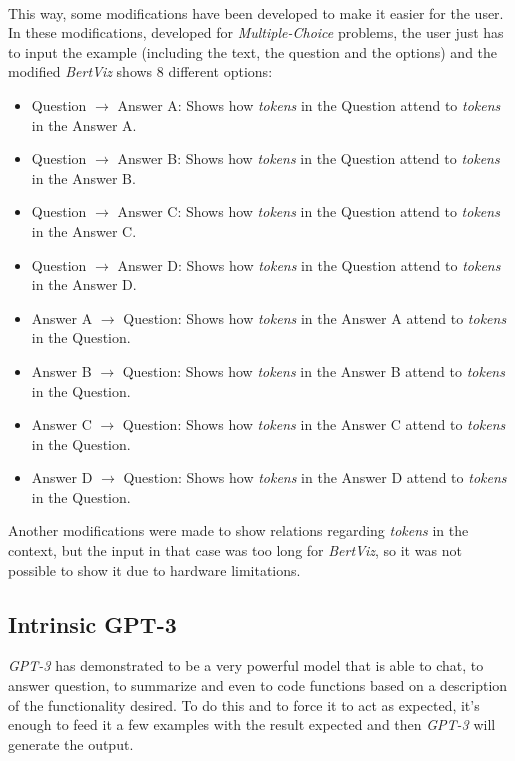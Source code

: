 \paragraph{}
This way, some modifications have been developed to make it easier for the user. In these modifications, developed for \emph{Multiple-Choice} problems, the user just has to input the example (including the text, the question and the options) and the modified \emph{BertViz} shows 8 different options:
\begin{itemize}
	\item Question $\rightarrow$ Answer A: Shows how \emph{tokens} in the Question attend to \emph{tokens} in the Answer A.
	\item Question $\rightarrow$ Answer B: Shows how \emph{tokens} in the Question attend to \emph{tokens} in the Answer B.
	\item Question $\rightarrow$ Answer C: Shows how \emph{tokens} in the Question attend to \emph{tokens} in the Answer C.
	\item Question $\rightarrow$ Answer D: Shows how \emph{tokens} in the Question attend to \emph{tokens} in the Answer D.
	\item Answer A $\rightarrow$ Question: Shows how \emph{tokens} in the Answer A attend to \emph{tokens} in the Question.
	\item Answer B $\rightarrow$ Question: Shows how \emph{tokens} in the Answer B attend to \emph{tokens} in the Question.
	\item Answer C $\rightarrow$ Question: Shows how \emph{tokens} in the Answer C attend to \emph{tokens} in the Question.
	\item Answer D $\rightarrow$ Question: Shows how \emph{tokens} in the Answer D attend to \emph{tokens} in the Question.
\end{itemize}
Another modifications were made to show relations regarding \emph{tokens} in the context, but the input in that case was too long for \emph{BertViz}, so it was not possible to show it due to hardware limitations.

\subsection{Intrinsic GPT-3}
\label{sec:gpt3}
\noindent \emph{GPT-3} has demonstrated to be a very powerful model that is able to chat, to answer question, to summarize and even to code functions based on a description of the functionality desired. To do this and to force it to act as expected, it's enough to feed it a few examples with the result expected and then \emph{GPT-3} will generate the output.

